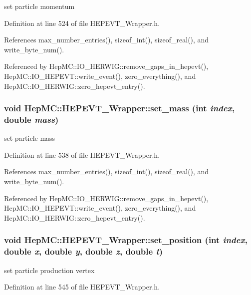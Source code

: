 set particle momentum 



Definition at line 524 of file HEPEVT\_\-Wrapper.h.

References max\_\-number\_\-entries(), sizeof\_\-int(), sizeof\_\-real(), and write\_\-byte\_\-num().

Referenced by Hep\-MC::IO\_\-HERWIG::remove\_\-gaps\_\-in\_\-hepevt(), Hep\-MC::IO\_\-HEPEVT::write\_\-event(), zero\_\-everything(), and Hep\-MC::IO\_\-HERWIG::zero\_\-hepevt\_\-entry().
\subsubsection{\setlength{\rightskip}{0pt plus 5cm}void Hep\-MC::HEPEVT\_\-Wrapper::set\_\-mass (int {\em index}, double {\em mass})\hspace{0.3cm}{\tt  [inline, static]}}\label{classHepMC_1_1HEPEVT__Wrapper_1b23c8c9ffb3a6e90ad0e00121ecadbc}


set particle mass 



Definition at line 538 of file HEPEVT\_\-Wrapper.h.

References max\_\-number\_\-entries(), sizeof\_\-int(), sizeof\_\-real(), and write\_\-byte\_\-num().

Referenced by Hep\-MC::IO\_\-HERWIG::remove\_\-gaps\_\-in\_\-hepevt(), Hep\-MC::IO\_\-HEPEVT::write\_\-event(), zero\_\-everything(), and Hep\-MC::IO\_\-HERWIG::zero\_\-hepevt\_\-entry().
\subsubsection{\setlength{\rightskip}{0pt plus 5cm}void Hep\-MC::HEPEVT\_\-Wrapper::set\_\-position (int {\em index}, double {\em x}, double {\em y}, double {\em z}, double {\em t})\hspace{0.3cm}{\tt  [inline, static]}}\label{classHepMC_1_1HEPEVT__Wrapper_c4cadb49454ee93175278703b1f0c33e}


set particle production vertex 



Definition at line 545 of file HEPEVT\_\-Wrapper.h.

